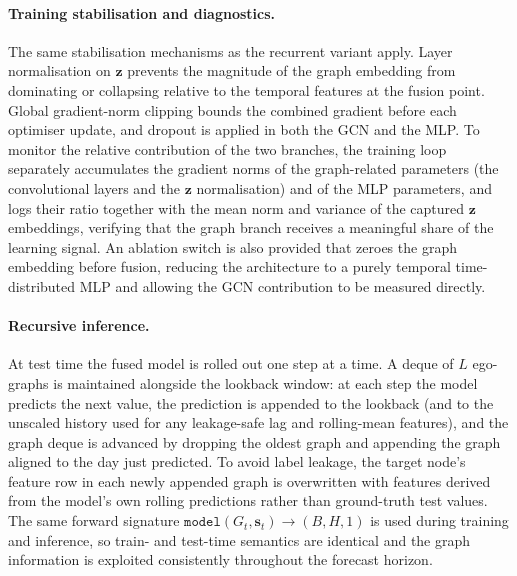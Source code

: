 \paragraph{Training stabilisation and diagnostics.}
The same stabilisation mechanisms as the recurrent variant apply. Layer
normalisation on $\mathbf{z}$ prevents the magnitude of the graph embedding
from dominating or collapsing relative to the temporal features at the fusion
point. Global gradient-norm clipping bounds the combined gradient before each
optimiser update, and dropout is applied in both the GCN and the MLP. To
monitor the relative contribution of the two branches, the training loop
separately accumulates the gradient norms of the graph-related parameters
(the convolutional layers and the $\mathbf{z}$ normalisation) and of the MLP
parameters, and logs their ratio together with the mean norm and variance of
the captured $\mathbf{z}$ embeddings, verifying that the graph branch receives
a meaningful share of the learning signal. An ablation switch is also provided
that zeroes the graph embedding before fusion, reducing the architecture to a
purely temporal time-distributed MLP and allowing the GCN contribution to be
measured directly.

\paragraph{Recursive inference.}
At test time the fused model is rolled out one step at a time. A deque of $L$
ego-graphs is maintained alongside the lookback window: at each step the model
predicts the next value, the prediction is appended to the lookback (and to the
unscaled history used for any leakage-safe lag and rolling-mean features), and
the graph deque is advanced by dropping the oldest graph and appending the
graph aligned to the day just predicted. To avoid label leakage, the target
node's feature row in each newly appended graph is overwritten with features
derived from the model's own rolling predictions rather than ground-truth test
values. The same forward signature
$\texttt{model}(G_t, \mathbf{s}_t) \rightarrow (B, H, 1)$ is used during
training and inference, so train- and test-time semantics are identical and the
graph information is exploited consistently throughout the forecast horizon.


